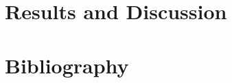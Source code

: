 \documentclass[10pt,twoside]{book}
\begin{document}
\chapter{Results and Discussion}
\clearpage

\clearpage

% 

\chapter{Bibliography}
\clearpage
\begin{multicols}{2}
\printbibliography[heading=none]
\end{multicols}

% 
\end{document}
